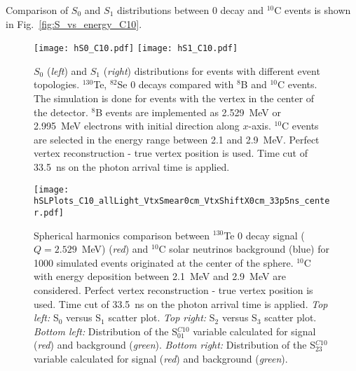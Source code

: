 \begin{comment}
We note that 98\% of $^{10}$C decays through the excited state of
$^{10}$B(718), which has a half-life time of $\sim$1~ns. Therefore, the
majority of $^{10}$C events have a prompt positron accompanied by a
delayed 0.718~MeV gamma. This delayed gamma affects the PE arrival time
distribution. Figure~\ref{fig:Arrival_time_C10} compares the shape of the
PE arrival time distribution between $^{130}$Te 0{\nbb} decays and
$^{10}$C events. The time profile of the scintillation photons can be used
to separate signal from $^{10}$C events.

\end{comment}


Comparison of $S_0$ and $S_1$ distributions between 0{\nbb} decay and
$^{10}$C events is shown in Fig.~\ref{fig:S_vs_energy_C10}.

\begin{figure*}[h]
\centering
\texttt{[image: hS0\_C10.pdf]}
\texttt{[image: hS1\_C10.pdf]}
\caption{$S_0$ (\emph{left}) and $S_1$ (\emph{right}) distributions
  for events with different event topologies. $^{130}$Te, $^{82}$Se 0{\nbb} 
  decays compared with $^{8}$B and $^{10}$C events. The simulation is done 
  for events with the vertex in the center of the detector. $^{8}$B events 
  are implemented as 2.529~MeV or 2.995~MeV electrons with initial direction 
  along $x$-axis. $^{10}$C events are selected in the energy range between 2.1 
  and 2.9~MeV. Perfect vertex reconstruction - true vertex position is used. 
  Time cut of 33.5~ns on the photon arrival time is applied.}
\label{fig:S_vs_energy}
\end{figure*}


\begin{figure}[h]
  \centering
  \texttt{[image: hSLPlots\_C10\_allLight\_VtxSmear0cm\_VtxShiftX0cm\_33p5ns\_center.pdf]}
  \caption{Spherical harmonics comparison between $^{130}$Te 0{\nbb}
    decay signal ($Q=2.529$~MeV) (\emph{red}) and $^{10}$C solar
    neutrinos background (blue) for 1000 simulated events originated
    at the center of the sphere. $^{10}$C with energy deposition
    between 2.1~MeV and 2.9~MeV are considered. Perfect vertex
    reconstruction - true vertex position is used. Time cut of 33.5~ns
    on the photon arrival time is applied. \emph{Top left:} S$_0$
    versus S$_1$ scatter plot. \emph{Top right:} S$_2$ versus S$_3$
    scatter plot. \emph{Bottom left:} Distribution of the
    S$^{C10}_{01}$ variable calculated for signal (\emph{red}) and
    background (\emph{green}). \emph{Bottom right:} Distribution of
    the S$^{C10}_{23}$ variable calculated for signal (\emph{red}) and
    background (\emph{green}).}
  \label{fig:SL_C10_33p5ns_center}
\end{figure}


